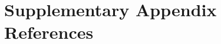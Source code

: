 \documentclass[10pt,onecolumn,twoside,lineno]{pnas-new}
\begin{document}











\section*{Supplementary Appendix References}

\end{document}
